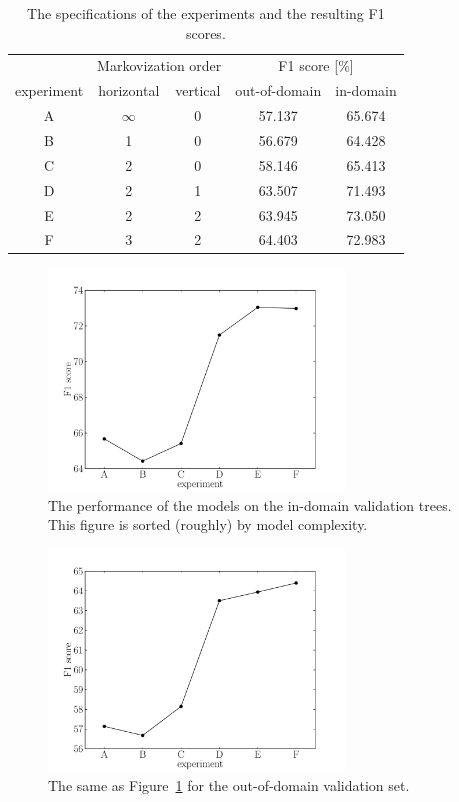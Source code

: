 \documentclass[11pt]{article}
\newcommand{\fig}[1]{Figure~\ref{fig:#1}}
\newcommand{\figlabel}[1]{\label{fig:#1}}
\begin{document}
\begin{table}[htbp]
\begin{center}
\begin{tabular}{ccccc}
\toprule
&\multicolumn{2}{c}{Markovization order}
&\multicolumn{2}{c}{F1 score [\%]} \\
experiment & horizontal & vertical & out-of-domain & in-domain \\\midrule
    A & $\infty$ & 0 & 57.137 & 65.674 \\
    B & 1 & 0 & 56.679 & 64.428 \\
    C & 2 & 0 & 58.146 & 65.413 \\
    D & 2 & 1 & 63.507 & 71.493 \\
    E & 2 & 2 & 63.945 & 73.050 \\
    F & 3 & 2 & 64.403 & 72.983 \\
\bottomrule
\end{tabular}
\end{center}
\caption{%
The specifications of the experiments and the resulting F1 scores.
\label{tab:results}}
\end{table}

\begin{figure}[htbp]
\begin{center}
    \includegraphics[width=0.7\textwidth]{in-domain.pdf}
\end{center}
\caption{%
The performance of the models on the in-domain validation trees.
This figure is sorted (roughly) by model complexity.
\figlabel{in-domain}}
\end{figure}

\begin{figure}[htbp]
\begin{center}
    \includegraphics[width=0.7\textwidth]{out-of-domain.pdf}
\end{center}
\caption{%
The same as \fig{in-domain} for the out-of-domain validation set.
\figlabel{out-of-domain}}
\end{figure}
\end{document}
